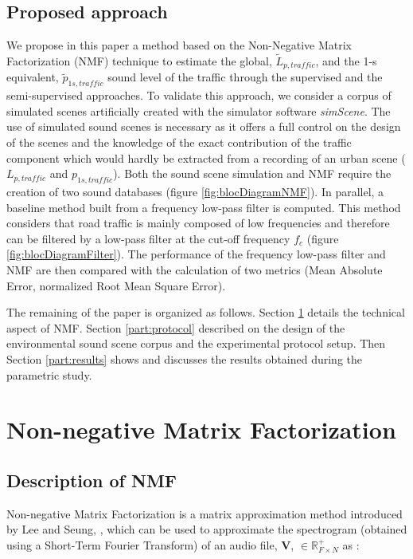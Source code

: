 \documentclass[twocolumn,a4paper,10pt]{article}
\newcommand{\ml}[1]{\textcolor{blue}{ Mathieu: #1}}
\begin{document}
\subsection{Proposed approach}

We propose in this paper a method based on the Non-Negative Matrix Factorization (NMF) technique to estimate the global, $\tilde{L}_{p,traffic}$, and the 1-s equivalent, $\tilde{p}_{1s,traffic}$ sound level of the traffic through the supervised and the semi-supervised approaches. To validate this approach, we consider a corpus of simulated scenes artificially created with the simulator software \textit{simScene}. The use of simulated sound scenes is necessary as it offers a full control on the design of the scenes and the knowledge of the exact contribution of the traffic component which would hardly be extracted from a recording of an urban scene ($L_{p,traffic}$ and $p_{1s,traffic}$). Both the sound scene simulation and NMF require the creation of two sound databases (figure  \ref{fig:blocDiagramNMF}). In parallel, a baseline method built from a frequency low-pass filter is computed. This method considers that road traffic is mainly composed of low frequencies and therefore can be filtered by a low-pass filter at the cut-off frequency $f_c$ (figure \ref{fig:blocDiagramFilter}). The performance of the frequency low-pass filter and NMF are then compared with the calculation of two metrics (Mean Absolute Error, normalized Root Mean Square Error). 

The remaining of the paper is organized as follows. Section \ref{part:nmf} details the technical aspect of NMF. Section \ref{part:protocol} described on the design of the environmental sound scene corpus and the experimental protocol setup. Then Section \ref{part:results} shows and discusses the results obtained during the parametric study.


\section{Non-negative Matrix Factorization}\label{part:nmf}
\subsection{Description of NMF}
Non-negative Matrix Factorization is a matrix approximation method introduced by Lee and Seung, \cite{lee_learning_1999}, which can be used to approximate the spectrogram (obtained using a Short-Term Fourier Transform) of an audio file, $\mathbf{V}$, $\in \mathbb{R}^+_{F \times N}$ as :
\end{document}
